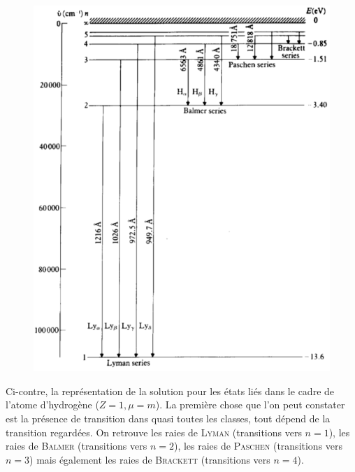 	\begin{figure}
	\vspace{-5mm}
	\includegraphics[scale=0.4]{ch1/image3}
	\end{figure}
	
	Ci-contre, la représentation de la solution pour les états liés dans le cadre de l'atome d'hydrogène
	($Z=1, \mu=m$). La première chose que l'on peut constater est la présence de transition dans quasi toutes
	les classes, tout dépend de la transition regardées. On retrouve les raies de \textsc{Lyman} (transitions
	vers $n=1$), les raies de \textsc{Balmer} (transitions vers $n=2$), les raies de \textsc{Paschen}
	(transitions vers $n=3$) mais également les raies de \textsc{Brackett} (transitions vers $n=4$).\\
	

